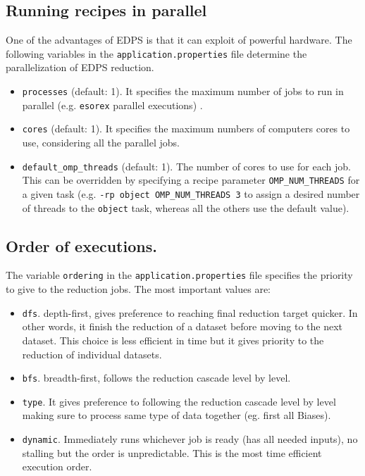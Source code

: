 \subsection{Running recipes in parallel}
One of the advantages of EDPS is that it can exploit of powerful hardware. 
The following variables in the {\tt application.properties} file determine the parallelization of EDPS reduction.
\begin{itemize}
    \item {\tt processes} (default: 1). It specifies the maximum  number of jobs to run in parallel (e.g. {\tt esorex} parallel executions) .
    
    \item {\tt cores} (default: 1). It specifies the maximum numbers of computers cores to use, considering all the parallel jobs.
    
    \item {\tt default\_omp\_threads} (default: 1). The number of cores to use for each job. This can be overridden by specifying a recipe parameter {\tt OMP\_NUM\_THREADS} for a given task (e.g. {\tt -rp object OMP\_NUM\_THREADS 3} to assign a desired number of threads to the {\tt object} task, whereas all the others use the default value).
\end{itemize}


\subsection{Order of executions.}
The variable {\tt ordering} in the {\tt application.properties} file specifies the priority to give to the reduction jobs. The most important values are:
\begin{itemize}
    \item {\tt dfs}. depth-first, gives preference to reaching final reduction target quicker. In other words, it finish the reduction of a dataset before moving to the next dataset.  This choice is less efficient in time but it gives priority to the reduction of individual datasets. 
    
    \item {\tt bfs}. breadth-first, follows the reduction cascade level by level.
    
    \item {\tt type}. It gives preference to following the reduction cascade level by level making sure to process same type of data together (eg. first all Biases).
    
    \item {\tt dynamic}. Immediately runs whichever job is ready (has all needed inputs), no stalling but the order is unpredictable. This is the most time efficient execution order.
\end{itemize}


